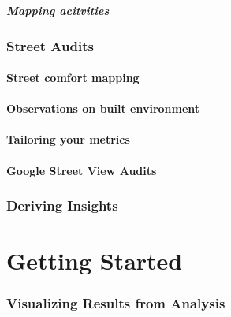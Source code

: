 \documentclass[
]{latex/krantz}
\begin{document}
\hypertarget{mapping-acitvities}{%
\subsubsection{Mapping acitvities}\label{mapping-acitvities}}

\hypertarget{street-audits}{%
\section{Street Audits}\label{street-audits}}

\hypertarget{street-comfort-mapping}{%
\subsection{Street comfort mapping}\label{street-comfort-mapping}}

\hypertarget{observations-on-built-environment}{%
\subsection{Observations on built environment}\label{observations-on-built-environment}}

\hypertarget{tailoring-your-metrics}{%
\subsection{Tailoring your metrics}\label{tailoring-your-metrics}}

\hypertarget{google-street-view-audits}{%
\subsection{Google Street View Audits}\label{google-street-view-audits}}

\hypertarget{deriving-insights}{%
\section{Deriving Insights}\label{deriving-insights}}

\hypertarget{part-getting-started-1}{%
\part{Getting Started}\label{part-getting-started-1}}

\hypertarget{visualizing-results-from-analysis}{%
\section{Visualizing Results from Analysis}\label{visualizing-results-from-analysis}}
\end{document}
